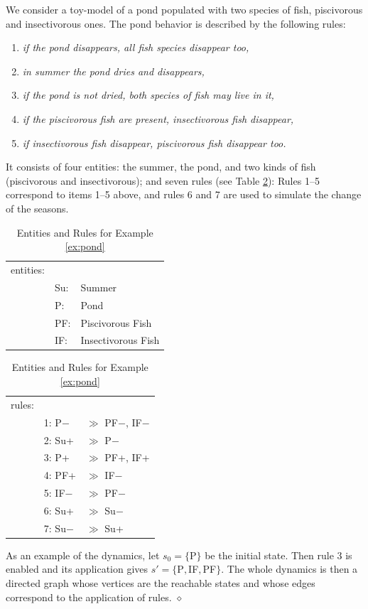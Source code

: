 \documentclass[a4paper,twoside]{article}
\begin{document}
\begin{example}[Pond] \label{ex:pond}
We  consider a toy-model of a pond populated with two species of fish, piscivorous and insectivorous ones. The pond behavior is described  by the following rules: 

\begin{enumerate}
\item %
\emph{if the pond disappears, all fish species disappear too,}
\item %
\emph{in summer the pond dries and disappears,} 
\item %
\emph{if the pond is not dried, both species of fish may live in it,} 
\item %
\emph{if the piscivorous fish are present, insectivorous fish disappear,}
\item %
\emph{if insectivorous fish disappear, piscivorous fish disappear too.}
\end{enumerate} %

 It consists of four entities: the summer, the pond, and two kinds of fish (piscivorous and insectivorous); and seven rules (see Table \ref{tab:pond}): Rules 1--5 correspond to items 1--5 above, and rules 6 and 7 are used to simulate the change of the seasons.
\begin{table}[t]
\centering
\begin{tabular}{lll}
entities:&& \\
    &Su: &Summer \\
    &P: &Pond \\
    &PF: &Piscivorous Fish  \\
    &IF: &Insectivorous Fish
\end{tabular} \qquad 
\begin{tabular}{lll}
rules:&& \\
    &1: P$-$ & $\gg$ PF$-$, IF$-$  \\
    &2: Su+ &$\gg$  P$-$  \\
    &3: P+  &$\gg$ PF+, IF+  \\
    &4: PF+ &$\gg$ IF$-$  \\
    &5: IF$-$ &$\gg$ PF$-$ \\
    &6: Su+ &$\gg$ Su$-$ \\
    &7: Su$-$ &$\gg$ Su+ 
\end{tabular}
\caption{Entities and Rules for Example \ref{ex:pond}}\label{tab:pond}
\end{table}

As an example of the dynamics, let $s_0=\{$P$\}$ be the initial state. Then rule 3 is enabled and its application gives $s'=\{$P$, $IF$, $PF$\}$.
The whole dynamics is then a directed graph whose vertices are the reachable states and whose edges correspond to the application of rules.
\hfill $\diamond$
\end{example}
\end{document}
